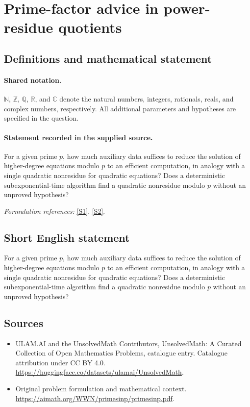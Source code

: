 \documentclass[11pt]{article}
\newcommand{\sref}[2]{\hyperlink{source:#1:#2}{[S#2]}}
\begin{document}
\section{Prime-factor advice in power-residue quotients}\label{statement}

\subsection{Definitions and mathematical statement}

\paragraph{Shared notation.}$\mathbb N$, $\mathbb Z$, $\mathbb Q$, $\mathbb R$, and $\mathbb C$ denote the natural numbers, integers, rationals, reals, and complex numbers, respectively. All additional parameters and hypotheses are specified in the question.


\paragraph{Statement recorded in the supplied source.}
For a given prime $p$, how much auxiliary data suffices to reduce the solution of higher-degree equations modulo $p$ to an efficient computation, in analogy with a single quadratic nonresidue for quadratic equations? Does a deterministic subexponential-time algorithm find a quadratic nonresidue modulo $p$ without an unproved hypothesis?
\par\smallskip\textit{Formulation references:} \sref{statement}{1}, \sref{statement}{2}.
\subsection{Short English statement}
For a given prime $p$, how much auxiliary data suffices to reduce the solution of higher-degree equations modulo $p$ to an efficient computation, in analogy with a single quadratic nonresidue for quadratic equations? Does a deterministic subexponential-time algorithm find a quadratic nonresidue modulo $p$ without an unproved hypothesis?
\subsection{Sources}
\begin{itemize}
\item[\hypertarget{source:statement:1}{S1}] ULAM.AI and the UnsolvedMath Contributors, UnsolvedMath: A Curated Collection of Open Mathematics Problems, catalogue entry. Catalogue attribution under CC BY 4.0.
\url{https://huggingface.co/datasets/ulamai/UnsolvedMath}.
\item[\hypertarget{source:statement:2}{S2}] Original problem formulation and mathematical context.
\url{https://aimath.org/WWN/primesinp/primesinp.pdf}.
\end{itemize}
\label{end:statement}
\end{document}
